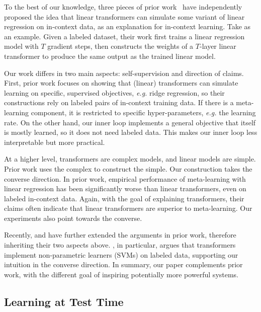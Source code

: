 \documentclass{article}
\begin{document}
To the best of our knowledge, three pieces of prior work~\citep{akyurek2022learning,dai2022can,von2023transformers}
have independently proposed the idea that linear transformers can simulate some variant of linear regression on in-context data, as an explanation for in-context learning.
Take \cite{von2023transformers} as an example. Given a labeled dataset, their work first trains a linear regression model with $T$ gradient steps, then constructs the weights of a $T$-layer linear transformer to produce the same output as the trained linear model.

Our work differs in two main aspects: self-supervision and direction of claims.
First, prior work focuses on showing that (linear) transformers can simulate learning on specific, supervised objectives, \textit{e.g.} ridge regression, so their constructions rely on labeled pairs of in-context training data.
If there is a meta-learning component, it is restricted to specific hyper-parameters, \textit{e.g.} the learning rate.
On the other hand, our inner loop implements a general objective that itself is mostly learned, so it does not need labeled data.
This makes our inner loop less interpretable but more practical.

At a higher level, transformers are complex models, and linear models are simple. 
Prior work uses the complex to construct the simple. 
Our construction takes the converse direction. 
In prior work, empirical performance of meta-learning with linear regression has been significantly worse than linear transformers, even on labeled in-context data.
Again, with the goal of explaining transformers, their claims often indicate that linear transformers are superior to meta-learning.
Our experiments also point towards the converse.

Recently, \cite{mahankali2023one,zhang2023trained,ahn2023transformers} and \cite{tarzanagh2023transformers} have further extended the arguments in prior work, therefore inheriting their two aspects above.
\cite{tarzanagh2023transformers}, in particular, argues that transformers implement non-parametric learners (SVMs) on labeled data, supporting our intuition in the converse direction.
In summary, our paper complements prior work, with the different goal of inspiring potentially more powerful systems.

\subsection{Learning at Test Time}
\label{subsec:rel-ttt}
\end{document}
